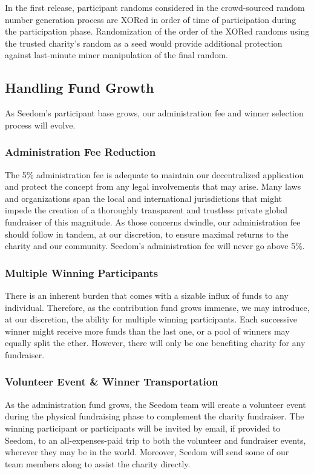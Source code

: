\documentclass[11pt]{article}
\begin{document}
In the first release, participant randoms considered in the crowd-sourced random number generation process are XORed in order of time of participation during the participation phase. Randomization of the order of the XORed randoms using the trusted charity's random as a seed would provide additional protection against last-minute miner manipulation of the final random.

\subsection{Handling Fund Growth}

As Seedom's participant base grows, our administration fee and winner selection process will evolve.

\subsubsection{Administration Fee Reduction}

The 5\% administration fee is adequate to maintain our decentralized application and protect the concept from any legal involvements that may arise. Many laws and organizations span the local and international jurisdictions that might impede the creation of a thoroughly transparent and trustless private global fundraiser of this magnitude. As those concerns dwindle, our administration fee should follow in tandem, at our discretion, to ensure maximal returns to the charity and our community. Seedom's administration fee will never go above 5\%.

\subsubsection{Multiple Winning Participants}

There is an inherent burden that comes with a sizable influx of funds to any individual. Therefore, as the contribution fund grows immense, we may introduce, at our discretion, the ability for multiple winning participants. Each successive winner might receive more funds than the last one, or a pool of winners may equally split the ether. However, there will only be one benefiting charity for any fundraiser.

\subsubsection{Volunteer Event \& Winner Transportation}

As the administration fund grows, the Seedom team will create a volunteer event during the physical fundraising phase to complement the charity fundraiser. The winning participant or participants will be invited by email, if provided to Seedom, to an all-expenses-paid trip to both the volunteer and fundraiser events, wherever they may be in the world. Moreover, Seedom will send some of our team members along to assist the charity directly.
\end{document}
